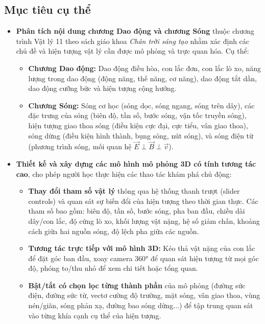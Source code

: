 \subsection{Mục tiêu cụ thể}
\begin{itemize}
    \item \textbf{Phân tích nội dung chương Dao động và chương Sóng} thuộc chương trình Vật lý 11 theo sách giáo khoa \textit{Chân trời sáng tạo} nhằm xác định các chủ đề và hiện tượng vật lý cần được mô phỏng và trực quan hóa. Cụ thể:
    \begin{itemize}
        \item \textbf{Chương Dao động:} Dao động điều hòa, con lắc đơn, con lắc lò xo, năng lượng trong dao động (động năng, thế năng, cơ năng), dao động tắt dần, dao động cưỡng bức và hiện tượng cộng hưởng.
        \item \textbf{Chương Sóng:} Sóng cơ học (sóng dọc, sóng ngang, sóng trên dây), các đặc trưng của sóng (biên độ, tần số, bước sóng, vận tốc truyền sóng), hiện tượng giao thoa sóng (điều kiện cực đại, cực tiểu, vân giao thoa), sóng dừng (điều kiện hình thành, bụng sóng, nút sóng), và sóng điện từ (phương trình sóng, mối quan hệ $\vec{E} \perp \vec{B} \perp \vec{v}$).
    \end{itemize}
    
    \item \textbf{Thiết kế và xây dựng các mô hình mô phỏng 3D có tính tương tác cao}, cho phép người học thực hiện các thao tác khám phá chủ động:
    \begin{itemize}
        \item \textbf{Thay đổi tham số vật lý} thông qua hệ thống thanh trượt (slider controls) và quan sát sự biến đổi của hiện tượng theo thời gian thực. Các tham số bao gồm: biên độ, tần số, bước sóng, pha ban đầu, chiều dài dây/con lắc, độ cứng lò xo, khối lượng vật nặng, hệ số giảm chấn, khoảng cách giữa hai nguồn sóng, độ lệch pha giữa các nguồn.
        \item \textbf{Tương tác trực tiếp với mô hình 3D:} Kéo thả vật nặng của con lắc để đặt góc ban đầu, xoay camera 360° để quan sát hiện tượng từ mọi góc độ, phóng to/thu nhỏ để xem chi tiết hoặc tổng quan.
        \item \textbf{Bật/tắt có chọn lọc từng thành phần} của mô phỏng (đường sức điện, đường sức từ, vectơ cường độ trường, mặt sóng, vân giao thoa, vùng nén/giãn, sóng phản xạ, đường bao sóng dừng...) để tập trung quan sát vào từng khía cạnh cụ thể của hiện tượng.
    \end{itemize}
    

\end{itemize}
